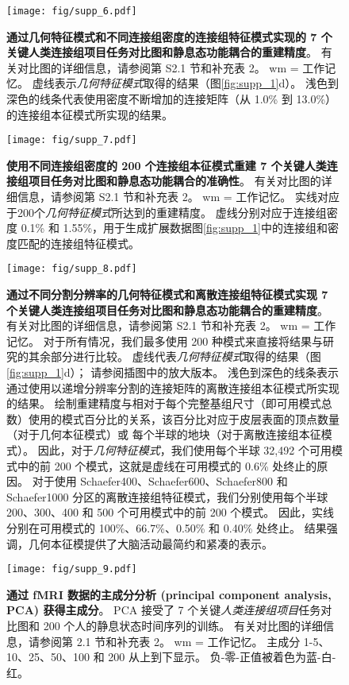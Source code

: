 \documentclass[lang=cn,a4paper,newtx]{elegantpaper}
\begin{document}
\begin{figure}[!htb] 
	\centering
	\texttt{[image: fig/supp\_6.pdf]}
	\caption{
		\textbf{通过几何特征模式和不同连接组密度的连接组特征模式实现的 7 个关键人类连接组项目任务对比图和静息态功能耦合的重建精度}。
		有关对比图的详细信息，请参阅第 S2.1 节和补充表 2。
		wm = 工作记忆。
		虚线表示\textit{几何特征模式}取得的结果（图\ref{fig:supp_1}d）。
		浅色到深色的线条代表使用密度不断增加的连接矩阵（从 1.0\% 到 13.0\%）的连接组本征模式所实现的结果。
	} \label{fig:supp_6}
\end{figure}


\begin{figure}[!htb] 
	\centering
	\texttt{[image: fig/supp\_7.pdf]}
	\caption{
		\textbf{使用不同连接组密度的 200 个连接组本征模式重建 7 个关键人类连接组项目任务对比图和静息态功能耦合的准确性}。
		有关对比图的详细信息，请参阅第 S2.1 节和补充表 2。
		wm = 工作记忆。
		实线对应于200个\textit{几何特征模式}所达到的重建精度。
		虚线分别对应于连接组密度 0.1\% 和 1.55\%，用于生成扩展数据图\ref{fig:supp_1}中的连接组和密度匹配的连接组特征模式。
	} \label{fig:supp_7}
\end{figure}


\begin{figure}[!htb] 
	\centering
	\texttt{[image: fig/supp\_8.pdf]}
	\caption{
	\textbf{通过不同分割分辨率的几何特征模式和离散连接组特征模式实现 7 个关键人类连接组项目任务对比图和静息态功能耦合的重建精度}。
	有关对比图的详细信息，请参阅第 S2.1 节和补充表 2。 wm = 工作记忆。
	对于所有情况，我们最多使用 200 种模式来直接将结果与研究的其余部分进行比较。
	虚线代表\textit{几何特征模式}取得的结果（图\ref{fig:supp_1}d）；
	请参阅插图中的放大版本。
	浅色到深色的线条表示通过使用以递增分辨率分割的连接矩阵的离散连接组本征模式所实现的结果。
	绘制重建精度与相对于每个完整基组尺寸（即可用模式总数）使用的模式百分比的关系，该百分比对应于皮层表面的顶点数量（对于几何本征模式）或 每个半球的地块（对于离散连接组本征模式）。
	因此，对于\textit{几何特征模式}，我们使用每个半球 32,492 个可用模式中的前 200 个模式，这就是虚线在可用模式的 0.6\% 处终止的原因。
	对于使用 Schaefer400、Schaefer600、Schaefer800 和 Schaefer1000 分区的离散连接组特征模式，我们分别使用每个半球 200、300、400 和 500 个可用模式中的前 200 个模式。
	因此，实线分别在可用模式的 100\%、66.7\%、0.50\% 和 0.40\% 处终止。
	结果强调，几何本征模提供了大脑活动最简约和紧凑的表示。
	} \label{fig:supp_8}
\end{figure}



\begin{figure}[!htb] 
	\centering
	\texttt{[image: fig/supp\_9.pdf]}
	\caption{
		\textbf{通过 fMRI 数据的主成分分析 (principal component analysis, PCA) 获得主成分}。
		PCA 接受了 7 个关键\textit{人类连接组项目}任务对比图和 200 个人的静息状态时间序列的训练。
		有关对比图的详细信息，请参阅第 2.1 节和补充表 2。
		wm = 工作记忆。
		主成分 1-5、10、25、50、100 和 200 从上到下显示。
		负-零-正值被着色为蓝-白-红。
	} \label{fig:supp_9}
\end{figure}
\end{document}
